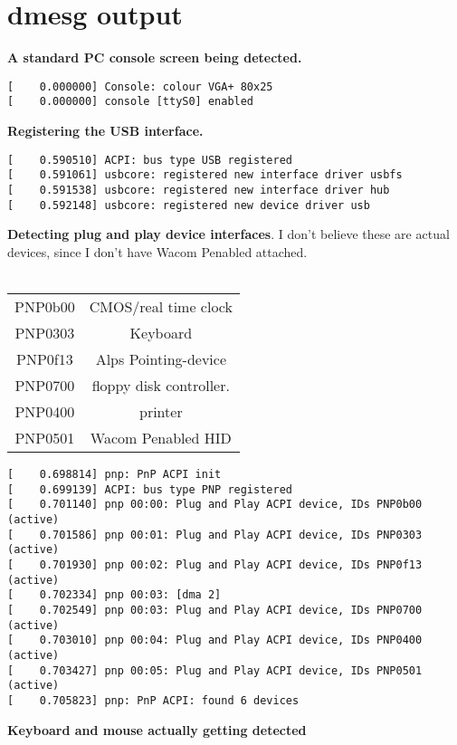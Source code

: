\documentclass[paper=a4, fontsize=11pt]{scrartcl} %
\numberwithin{equation}{section} %
\numberwithin{figure}{section} %
\numberwithin{table}{section} %
\begin{document}
\section{dmesg output}

\textbf{A standard PC console screen being detected.}
\begin{verbatim}
[    0.000000] Console: colour VGA+ 80x25
[    0.000000] console [ttyS0] enabled
\end{verbatim}

\textbf{Registering the USB interface.}
\begin{verbatim}
[    0.590510] ACPI: bus type USB registered
[    0.591061] usbcore: registered new interface driver usbfs
[    0.591538] usbcore: registered new interface driver hub
[    0.592148] usbcore: registered new device driver usb
\end{verbatim}

\textbf{Detecting plug and play device interfaces}. I don't believe these are actual devices, since I don't have Wacom Penabled attached.\\ \\
\begin{tabular}{ |c|c| } 
 \hline
PNP0b00 & CMOS/real time clock \\ 
PNP0303 & Keyboard\\
PNP0f13 & Alps Pointing-device \\ 
PNP0700 & floppy disk controller.\\
PNP0400 & printer\\
PNP0501 & Wacom Penabled HID\\
 \hline
\end{tabular}

\begin{verbatim}
[    0.698814] pnp: PnP ACPI init
[    0.699139] ACPI: bus type PNP registered
[    0.701140] pnp 00:00: Plug and Play ACPI device, IDs PNP0b00 (active)
[    0.701586] pnp 00:01: Plug and Play ACPI device, IDs PNP0303 (active)
[    0.701930] pnp 00:02: Plug and Play ACPI device, IDs PNP0f13 (active)
[    0.702334] pnp 00:03: [dma 2]
[    0.702549] pnp 00:03: Plug and Play ACPI device, IDs PNP0700 (active)
[    0.703010] pnp 00:04: Plug and Play ACPI device, IDs PNP0400 (active)
[    0.703427] pnp 00:05: Plug and Play ACPI device, IDs PNP0501 (active)
[    0.705823] pnp: PnP ACPI: found 6 devices
\end{verbatim}

\textbf{Keyboard and mouse actually getting detected}
\end{document}
